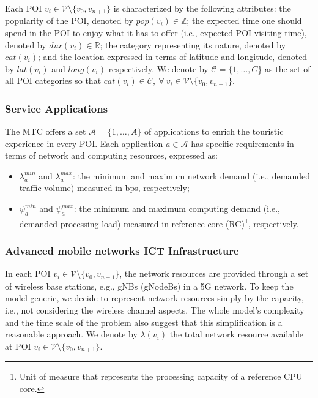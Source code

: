 Each POI $v_{i} \in \mathcal{V} \setminus \{v_{0}, v_{n+1}\}$ is characterized by the following attributes: the popularity of the POI, denoted by $pop(v_{i}) \in \mathbb{Z}$; the expected time one should spend in the POI to enjoy what it has to offer (i.e., expected POI visiting time), denoted by $dur(v_{i}) \in \mathbb{R}$; the category representing its nature, denoted by $cat(v_{i})$; and the location expressed in terms of latitude and longitude, denoted by $lat(v_{i})$ and $long(v_{i})$ respectively. We denote by $\mathcal{C} = \{1, \dots, C$\} {as} the set of all POI categories so that $cat(v_{i}) \in \mathcal{C}, \ \forall \ v_{i} \in \mathcal{V} \setminus \{v_{0}, v_{n+1}\}$.

\subsubsection{{\textbf{Service Applications}}}

The MTC offers a set $\mathcal{A} = \{1, \dots, A\}$ of applications to enrich the touristic experience in every POI. Each application $a \in \mathcal{A}$ has specific requirements in terms of network and computing resources, expressed as:

\begin{itemize}
    \item $\lambda^{min}_{a}$ and $\lambda^{max}_{a}$: the minimum and maximum network demand (i.e., demanded traffic volume) measured in bps, respectively;
    \item $\psi^{min}_{a}$ and $\psi^{max}_{a}$: the minimum and maximum computing demand (i.e., demanded processing load) measured in reference core (RC)\footnote{Unit of measure that represents the processing capacity of a reference CPU core.}, respectively.
\end{itemize}

\subsubsection{{\textbf{Advanced mobile networks ICT Infrastructure}}}

In each POI $v_{i} \in \mathcal{V} \setminus \{v_{0}, v_{n+1}\}$, the network resources are provided through a set of {wireless base stations, e.g., gNBs (gNodeBs) in a 5G network}. To keep the model generic, we decide to represent network resources simply by the capacity, i.e., not considering the wireless channel aspects. The whole model's complexity and the time scale of the problem also suggest that this {simplification} is a reasonable approach. We denote by $\lambda({v_{i}})$ the total network resource available at POI $v_{i} \in \mathcal{V} \setminus \{v_{0}, v_{n+1}\}$. 

